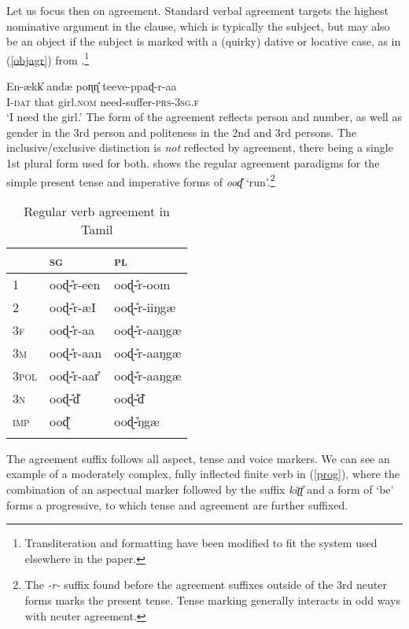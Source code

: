 \documentclass[output=paper, modfonts, nonflat]{langsci/langscibook}
\begin{document}
Let us focus then on agreement. Standard verbal agreement targets the
highest nominative argument in the clause, which is typically the
subject, but may also be an object if the subject is marked with a
(quirky) dative or locative case, as in (\ref{objagr}) from
\citet{baker:casepp}.\footnote{Transliteration and formatting have
  been modified to fit the system used elsewhere in the
  paper.}

\ea\label{objagr}\gll En-ækk\U{} andæ{} poɳɳ\U{} teeve-ppaɖ-r-aa\\ 
I-\textsc{dat}{} that girl.\textsc{nom}{} need-suffer-\textsc{prs}-3\textsc{sg.f}\\ 
\glt `I need the girl.'
\z
%
The form of the agreement reflects person and number, as well as
gender in the 3rd person and politeness in the 2nd and 3rd
persons. The inclusive/exclusive distinction is \emph{not} reflected
by agreement, there being a single 1st plural form used for
both.  shows the regular agreement paradigms
for the simple present tense and imperative forms of \textit{ooɖ\U}
`run'.\footnote{The \textit{-r-} suffix found before the agreement
  suffixes outside of the 3rd neuter forms marks the present
  tense. Tense marking generally interacts in odd ways with neuter
  agreement.}
  
\begin{table}
  \caption{Regular verb agreement in Tamil\label{tab:agrforms}}
  \begin{tabular}{lll} 
    \lsptoprule
    & \textsc{sg} & \textsc{pl}\\ 
    \midrule
    1 & ooɖ\U-r-een & ooɖ\U-r-oom \\
    2 & ooɖ\U-r-æI & ooɖ\U-r-iiŋgæ\\
    3\textsc{f} & ooɖ\U-r-aa & ooɖ\U-r-aaŋgæ\\
    3\textsc{m}& ooɖ\U-r-aan & ooɖ\U-r-aaŋgæ\\
    3\textsc{pol}& ooɖ\U-r-aar\U & ooɖ\U-r-aaŋgæ\\
    3\textsc{n} & ooɖ\U-d\U & ooɖ\U-d\U \\
    \textsc{imp} & ooɖ\U & ooɖ\U-ŋgæ\\
    \lspbottomrule
  \end{tabular}
\end{table}\noindent The agreement suffix follows all aspect, tense and voice markers.
We can see an example of a moderately complex, fully inflected finite
verb in (\ref{prog}), where the combination of an aspectual marker
followed by the suffix \textit{kiʈʈ\U} and a form of `be' forms a
progressive, to which tense and agreement are further suffixed.
\end{document}
